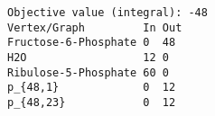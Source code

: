 \begin{verbatim}
Objective value (integral): -48
Vertex/Graph         In Out 
Fructose-6-Phosphate 0  48  
H2O                  12 0   
Ribulose-5-Phosphate 60 0   
p_{48,1}             0  12  
p_{48,23}            0  12  
\end{verbatim}
